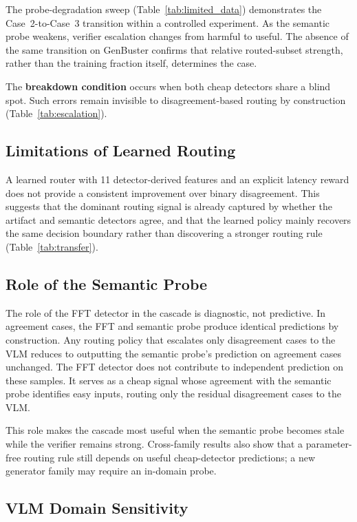 \documentclass{ieeeaccess}
\begin{document}
The probe-degradation sweep (Table~\ref{tab:limited_data}) demonstrates the
Case~2-to-Case~3 transition within a controlled experiment. As the semantic probe
weakens, verifier escalation changes from harmful to useful. The absence of the same
transition on GenBuster confirms that relative routed-subset strength, rather than the
training fraction itself, determines the case.

The \textbf{breakdown condition} occurs when both cheap detectors share a blind spot.
Such errors remain invisible to disagreement-based routing by construction
(Table~\ref{tab:escalation}).

\subsection{Limitations of Learned Routing}

A learned router with 11 detector-derived features and an explicit latency reward does
not provide a consistent improvement over binary disagreement. This suggests that the
dominant routing signal is already captured by whether the artifact and semantic
detectors agree, and that the learned policy mainly recovers the same decision boundary
rather than discovering a stronger routing rule (Table~\ref{tab:transfer}).


\subsection{Role of the Semantic Probe}

The role of the FFT detector in the cascade is diagnostic, not predictive. In agreement
cases, the FFT and semantic probe produce identical predictions by construction. Any
routing policy that escalates only disagreement cases to the VLM reduces to outputting
the semantic probe's prediction on agreement cases unchanged. The FFT detector
 does not contribute to independent prediction on these samples. It serves as a cheap signal
whose agreement with the semantic probe identifies easy inputs, routing only the
residual disagreement cases to the VLM.

This role makes the cascade most useful when the semantic probe becomes stale while the
verifier remains strong. Cross-family results also show that a parameter-free routing
rule still depends on useful cheap-detector predictions; a new generator family may
require an in-domain probe.

\subsection{VLM Domain Sensitivity}
\end{document}
